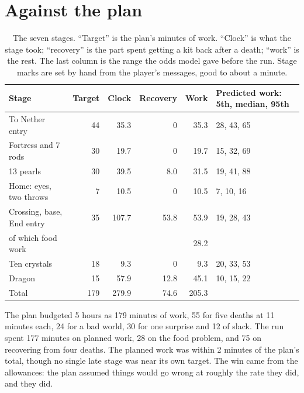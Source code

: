 \documentclass[11pt,a4paper]{article}
\begin{document}
\section{Against the plan}
\label{sec:plan}

\begin{table}[H]
\caption{The seven stages. ``Target'' is the plan's minutes of work. ``Clock'' is what the stage took; ``recovery'' is the part spent getting a kit back after a death; ``work'' is the rest. The last column is the range the odds model gave before the run. Stage marks are set by hand from the player's messages, good to about a minute.}
\label{tab:stages}
\small
\begin{tabularx}{\textwidth}{@{}Xrrrrl@{}}
\toprule
Stage & Target & Clock & Recovery & Work & Predicted work: 5th, median, 95th \\
\midrule
To Nether entry & 44 & 35.3 & 0 & 35.3 & 28, 43, 65 \\
Fortress and 7 rods & 30 & 19.7 & 0 & 19.7 & 15, 32, 69 \\
13 pearls & 30 & 39.5 & 8.0 & 31.5 & 19, 41, 88 \\
Home: eyes, two throws & 7 & 10.5 & 0 & 10.5 & 7, 10, 16 \\
Crossing, base, End entry & 35 & 107.7 & 53.8 & 53.9 & 19, 28, 43 \\
\quad of which food work & & & & 28.2 & \\
Ten crystals & 18 & 9.3 & 0 & 9.3 & 20, 33, 53 \\
Dragon & 15 & 57.9 & 12.8 & 45.1 & 10, 15, 22 \\
\midrule
Total & 179 & 279.9 & 74.6 & 205.3 & \\
\bottomrule
\end{tabularx}
\end{table}

The plan budgeted 5 hours as 179 minutes of work, 55 for five deaths at 11 minutes each, 24 for a bad world, 30 for one surprise and 12 of slack. The run spent 177 minutes on planned work, 28 on the food problem, and 75 on recovering from four deaths. The planned work was within 2 minutes of the plan's total, though no single late stage was near its own target. The win came from the allowances: the plan assumed things would go wrong at roughly the rate they did, and they did.
\end{document}
